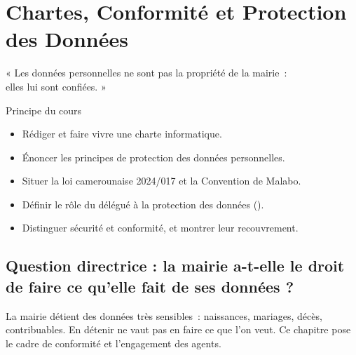 
\chapter{Chartes, Conformité et Protection des Données}
\label{chap:conformite}

\epigraph{%
    « Les données personnelles ne sont pas la propriété de la mairie~:\\
    elles lui sont confiées. »%
}{Principe du cours}


\begin{boxobjectifs}
\begin{itemize}
    \item Rédiger et faire vivre une charte informatique.
    \item Énoncer les principes de protection des données personnelles.
    \item Situer la loi camerounaise 2024/017 et la Convention de Malabo.
    \item Définir le rôle du délégué à la protection des données ().
    \item Distinguer sécurité et conformité, et montrer leur recouvrement.
\end{itemize}
\end{boxobjectifs}

\bigskip

\section*{Question directrice : la mairie a-t-elle le droit de faire ce qu'elle fait de ses données ?}

La mairie détient des données très sensibles~: naissances, mariages, décès,
contribuables. En détenir ne vaut pas en faire ce que l'on veut. Ce chapitre
pose le cadre de conformité et l'engagement des agents.

